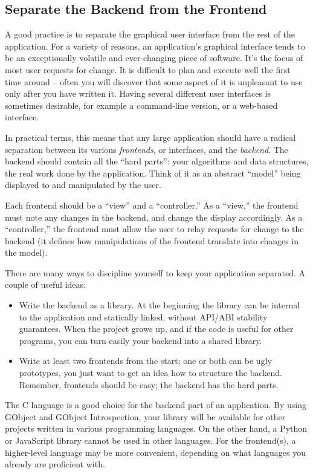 \subsection{Separate the Backend from the Frontend}
\label{intro-backend-frontend-separation}
A good practice is to separate the graphical user interface from the rest of the application. For a variety of reasons, an application's graphical interface tends to be an exceptionally volatile and ever-changing piece of software. It's the focus of most user requests for change. It is difficult to plan and execute well the first time around -- often you will discover that some aspect of it is unpleasant to use only after you have written it. Having several different user interfaces is sometimes desirable, for example a command-line version, or a web-based interface.

In practical terms, this means that any large application should have a radical separation between its various \emph{frontends}, or interfaces, and the \emph{backend}. The backend should contain all the ``hard parts'': your algorithms and data structures, the real work done by the application. Think of it as an abstract ``model'' being displayed to and manipulated by the user.

Each frontend should be a ``view'' and a ``controller.'' As a ``view,'' the frontend must note any changes in the backend, and change the display accordingly. As a ``controller,'' the frontend must allow the user to relay requests for change to the backend (it defines how manipulations of the frontend translate into changes in the model).

There are many ways to discipline yourself to keep your application separated. A couple of useful ideas:
\begin{itemize}
  \item Write the backend as a library. At the beginning the library can be internal to the application and statically linked, without API/ABI stability guarantees. When the project grows up, and if the code is useful for other programs, you can turn easily your backend into a shared library.
  \item Write at least two frontends from the start; one or both can be ugly prototypes, you just want to get an idea how to structure the backend. Remember, frontends should be easy; the backend has the hard parts.
\end{itemize}

The C language is a good choice for the backend part of an application. By using GObject and GObject Introspection, your library will be available for other projects written in various programming languages. On the other hand, a Python or JavaScript library cannot be used in other languages. For the frontend(s), a higher-level language may be more convenient, depending on what languages you already are proficient with.

